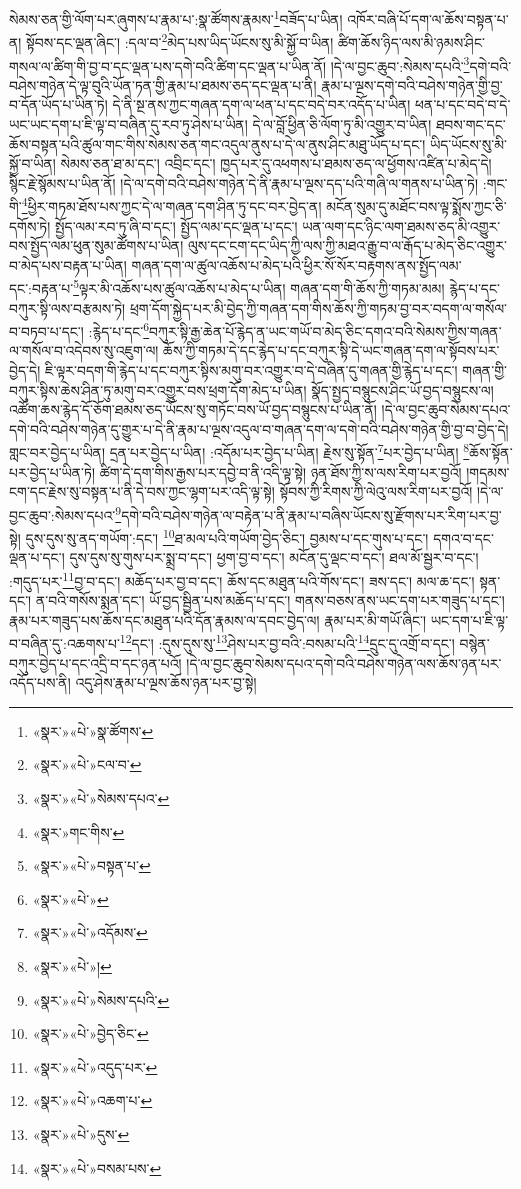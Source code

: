 སེམས་ཅན་གྱི་ལོག་པར་ཞུགས་པ་རྣམ་པ་:སྣ་ཚོགས་རྣམས་\footnote{«སྣར་»«པེ་»སྣ་ཚོགས་}བཟོད་པ་ཡིན། འཁོར་བཞི་པོ་དག་ལ་ཆོས་བསྟན་པ་ན། སྟོབས་དང་ལྡན་ཞིང་། :དལ་བ་\footnote{«སྣར་»«པེ་»ངལ་བ་}མེད་པས་ཡིད་ཡོངས་སུ་མི་སྐྱོ་བ་ཡིན། ཚིག་ཆོས་ཉིད་ལས་མི་ཉམས་ཤིང་གསལ་ལ་ཚིག་གི་བྱ་བ་དང་ལྡན་པས་དགེ་བའི་ཚིག་དང་ལྡན་པ་ཡིན་ནོ། །དེ་ལ་བྱང་ཆུབ་:སེམས་དཔའི་\footnote{«སྣར་»«པེ་»སེམས་དཔའ་}དགེ་བའི་བཤེས་གཉེན་དེ་ལྟ་བུའི་ཡོན་ཏན་གྱི་རྣམ་པ་ཐམས་ཅད་དང་ལྡན་པ་ནི། རྣམ་པ་ལྔས་དགེ་བའི་བཤེས་གཉེན་གྱི་བྱ་བ་དོན་ཡོད་པ་ཡིན་ཏེ། དེ་ནི་སྔ་ནས་ཀྱང་གཞན་དག་ལ་ཕན་པ་དང་བདེ་བར་འདོད་པ་ཡིན། ཕན་པ་དང་བདེ་བ་དེ་ཡང་ཡང་དག་པ་ཇི་ལྟ་བ་བཞིན་དུ་རབ་ཏུ་ཤེས་པ་ཡིན། དེ་ལ་བློ་ཕྱིན་ཅི་ལོག་ཏུ་མི་འགྱུར་བ་ཡིན། ཐབས་གང་དང་ཆོས་བསྟན་པའི་ཚུལ་གང་གིས་སེམས་ཅན་གང་འདུལ་ནུས་པ་དེ་ལ་ནུས་ཤིང་མཐུ་ཡོད་པ་དང་། ཡིད་ཡོངས་སུ་མི་སྐྱོ་བ་ཡིན། སེམས་ཅན་ཐ་མ་དང་། འབྲིང་དང་། ཁྱད་པར་དུ་འཕགས་པ་ཐམས་ཅད་ལ་ཕྱོགས་འཛིན་པ་མེད་དེ། སྙིང་རྗེ་སྙོམས་པ་ཡིན་ནོ། །དེ་ལ་དགེ་བའི་བཤེས་གཉེན་དེ་ནི་རྣམ་པ་ལྔས་དད་པའི་གཞི་ལ་གནས་པ་ཡིན་ཏེ། :གང་གི་\footnote{«སྣར་»གང་གིས་}ཕྱིར་གཏམ་ཐོས་པས་ཀྱང་དེ་ལ་གཞན་དག་ཤིན་ཏུ་དང་བར་བྱེད་ན། མངོན་སུམ་དུ་མཐོང་བས་ལྟ་སྨོས་ཀྱང་ཅི་དགོས་ཏེ། སྤྱོད་ལམ་རབ་ཏུ་ཞི་བ་དང་། སྤྱོད་ལམ་དང་ལྡན་པ་དང་། ཡན་ལག་དང་ཉིང་ལག་ཐམས་ཅད་མི་འགྱུར་བས་སྤྱོད་ལམ་ཕུན་སུམ་ཚོགས་པ་ཡིན། ལུས་དང་ངག་དང་ཡིད་ཀྱི་ལས་ཀྱི་མཐའ་རྒྱུ་བ་ལ་རྒོད་པ་མེད་ཅིང་འགྱུར་བ་མེད་པས་བརྟན་པ་ཡིན། གཞན་དག་ལ་ཚུལ་འཆོས་པ་མེད་པའི་ཕྱིར་སོ་སོར་བརྟགས་ནས་སྤྱོད་ལམ་དང་:བརྟན་པ་\footnote{«སྣར་»«པེ་»བསྟན་པ་}ལྟར་མི་འཆོས་པས་ཚུལ་འཆོས་པ་མེད་པ་ཡིན། གཞན་དག་གི་ཆོས་ཀྱི་གཏམ་མམ། རྙེད་པ་དང་བཀུར་སྟི་ལས་བརྩམས་ཏེ། ཕྲག་དོག་སྐྱེད་པར་མི་བྱེད་ཀྱི་གཞན་དག་གིས་ཆོས་ཀྱི་གཏམ་བྱ་བར་བདག་ལ་གསོལ་བ་བཏབ་པ་དང་། :རྙེད་པ་དང་\footnote{«སྣར་»«པེ་»}བཀུར་སྟི་རྒྱ་ཆེན་པོ་རྙེད་ན་ཡང་གཡོ་བ་མེད་ཅིང་དགའ་བའི་སེམས་ཀྱིས་གཞན་ལ་གསོལ་བ་འདེབས་སུ་འཇུག་ལ། ཆོས་ཀྱི་གཏམ་དེ་དང་རྙེད་པ་དང་བཀུར་སྟི་དེ་ཡང་གཞན་དག་ལ་སྟོབས་པར་བྱེད་དེ། ཇི་ལྟར་བདག་གི་རྙེད་པ་དང་བཀུར་སྟིས་མགུ་བར་འགྱུར་བ་དེ་བཞིན་དུ་གཞན་གྱི་རྙེད་པ་དང་། གཞན་གྱི་བཀུར་སྟིས་ཆེས་ཤིན་ཏུ་མགུ་བར་འགྱུར་བས་ཕྲག་དོག་མེད་པ་ཡིན། སྣོད་སྤྱད་བསྙུངས་ཤིང་ཡོ་བྱད་བསྙུངས་ལ། འཚོག་ཆས་རྙེད་དོ་ཅོག་ཐམས་ཅད་ཡོངས་སུ་གཏོང་བས་ཡོ་བྱད་བསྙུངས་པ་ཡིན་ནོ། །དེ་ལ་བྱང་ཆུབ་སེམས་དཔའ་དགེ་བའི་བཤེས་གཉེན་དུ་གྱུར་པ་དེ་ནི་རྣམ་པ་ལྔས་འདུལ་བ་གཞན་དག་ལ་དགེ་བའི་བཤེས་གཉེན་གྱི་བྱ་བ་བྱེད་དེ། གླང་བར་བྱེད་པ་ཡིན། དྲན་པར་བྱེད་པ་ཡིན། :འདོམ་པར་བྱེད་པ་ཡིན། རྗེས་སུ་སྟོན་\footnote{«སྣར་»«པེ་»འདོམས་}པར་བྱེད་པ་ཡིན། \footnote{«སྣར་»«པེ་»།  }ཆོས་སྟོན་པར་བྱེད་པ་ཡིན་ཏེ། ཚིག་དེ་དག་གིས་རྒྱས་པར་དབྱེ་བ་ནི་འདི་ལྟ་སྟེ། ཉན་ཐོས་ཀྱི་ས་ལས་རིག་པར་བྱའོ། །གདམས་ངག་དང་རྗེས་སུ་བསྟན་པ་ནི་དེ་བས་ཀྱང་ལྷག་པར་འདི་ལྟ་སྟེ། སྟོབས་ཀྱི་རིགས་ཀྱི་ལེའུ་ལས་རིག་པར་བྱའོ། །དེ་ལ་བྱང་ཆུབ་:སེམས་དཔའ་\footnote{«སྣར་»«པེ་»སེམས་དཔའི་}དགེ་བའི་བཤེས་གཉེན་ལ་བརྟེན་པ་ནི་རྣམ་པ་བཞིས་ཡོངས་སུ་རྫོགས་པར་རིག་པར་བྱ་སྟེ། དུས་དུས་སུ་ནད་གཡོག་:དང་། \footnote{«སྣར་»«པེ་»བྱེད་ཅིང་}ཐ་མལ་པའི་གཡོག་བྱེད་ཅིང་། བྱམས་པ་དང་གུས་པ་དང་། དགའ་བ་དང་ལྡན་པ་དང་། དུས་དུས་སུ་གུས་པར་སྨྲ་བ་དང་། ཕྱག་བྱ་བ་དང་། མངོན་དུ་ལྡང་བ་དང་། ཐལ་མོ་སྦྱར་བ་དང་། :གདུད་པར་\footnote{«སྣར་»«པེ་»འདུད་པར་}བྱ་བ་དང་། མཆོད་པར་བྱ་བ་དང་། ཆོས་དང་མཐུན་པའི་གོས་དང་། ཟས་དང་། མལ་ཆ་དང་། སྟན་དང་། ན་བའི་གསོས་སྨན་དང་། ཡོ་བྱད་སྦྱིན་པས་མཆོད་པ་དང་། གནས་བཅས་ནས་ཡང་དག་པར་གཟུད་པ་དང་། རྣམ་པར་གཟུད་པས་ཆོས་དང་མཐུན་པའི་དོན་རྣམས་ལ་དབང་བྱེད་ལ། རྣམ་པར་མི་གཡོ་ཞིང་། ཡང་དག་པ་ཇི་ལྟ་བ་བཞིན་དུ་:འཆགས་པ་\footnote{«སྣར་»«པེ་»འཆག་པ་}དང་། :དུས་དུས་སུ་\footnote{«སྣར་»«པེ་»དུས་}ཤེས་པར་བྱ་བའི་:བསམ་པའི་\footnote{«སྣར་»«པེ་»བསམ་པས་}དྲུང་དུ་འགྲོ་བ་དང་། བསྙེན་བཀུར་བྱེད་པ་དང་འདྲི་བ་དང་ཉན་པའོ། །དེ་ལ་བྱང་ཆུབ་སེམས་དཔའ་དགེ་བའི་བཤེས་གཉེན་ལས་ཆོས་ཉན་པར་འདོད་པས་ནི། འདུ་ཤེས་རྣམ་པ་ལྔས་ཆོས་ཉན་པར་བྱ་སྟེ། 